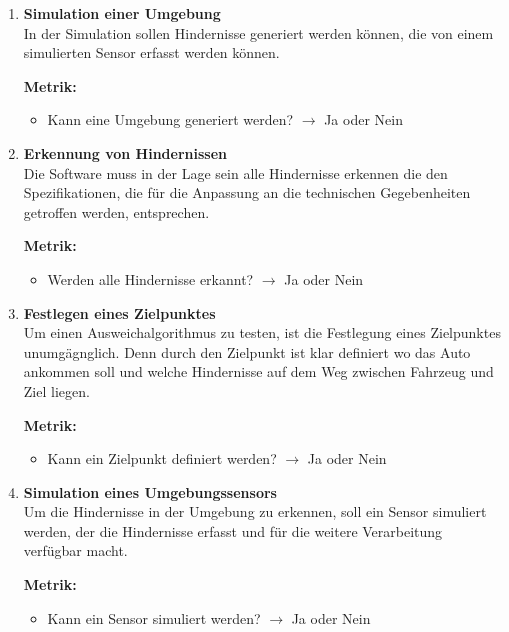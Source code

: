 \begin{enumerate}[leftmargin=*]
    \item \textbf{Simulation einer Umgebung}\\
    In der Simulation sollen Hindernisse generiert werden können, die von einem simulierten Sensor erfasst werden können.

    \textbf{Metrik:} 
    \begin{itemize}
        \item Kann eine Umgebung generiert werden? $\to$ Ja oder Nein
    \end{itemize}
    
    \item \textbf{Erkennung von Hindernissen}\\
    Die Software muss in der Lage sein alle Hindernisse erkennen die den Spezifikationen, 
    die für die Anpassung an die technischen Gegebenheiten getroffen werden, 
    entsprechen.

    \textbf{Metrik:} 
    \begin{itemize}
        \item Werden alle Hindernisse erkannt? $\to$ Ja oder Nein
    \end{itemize}
    
    \item \textbf{Festlegen eines Zielpunktes}\\
    Um einen Ausweichalgorithmus zu testen, ist die Festlegung eines Zielpunktes unumgägnglich. 
    Denn durch den Zielpunkt ist klar definiert wo das Auto ankommen soll und welche Hindernisse auf dem Weg zwischen Fahrzeug und Ziel liegen.

    \textbf{Metrik:} 
    \begin{itemize}
        \item Kann ein Zielpunkt definiert werden? $\to$ Ja oder Nein
    \end{itemize}
    
    \item \textbf{Simulation eines Umgebungssensors}\\
    Um die Hindernisse in der Umgebung zu erkennen, soll ein Sensor simuliert werden, der die Hindernisse erfasst und für die weitere Verarbeitung verfügbar macht.

    \textbf{Metrik:}
    \begin{itemize}
        \item Kann ein Sensor simuliert werden? $\to$ Ja oder Nein
    \end{itemize}
    

\end{enumerate}
